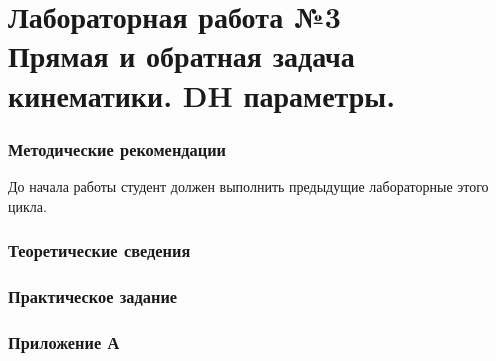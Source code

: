 \documentclass[12pt,a4paper,openany]{extarticle}
\begin{document}
\part*{Лабораторная работа №3\\ Прямая и обратная задача кинематики. DH параметры.}
\section{Методические рекомендации}
\hspace*{\parindent}До начала работы студент должен выполнить предыдущие лабораторные этого цикла.

\section{Теоретические сведения}

 



\section{Практическое задание}


\section{Приложение А}

\end{document}
